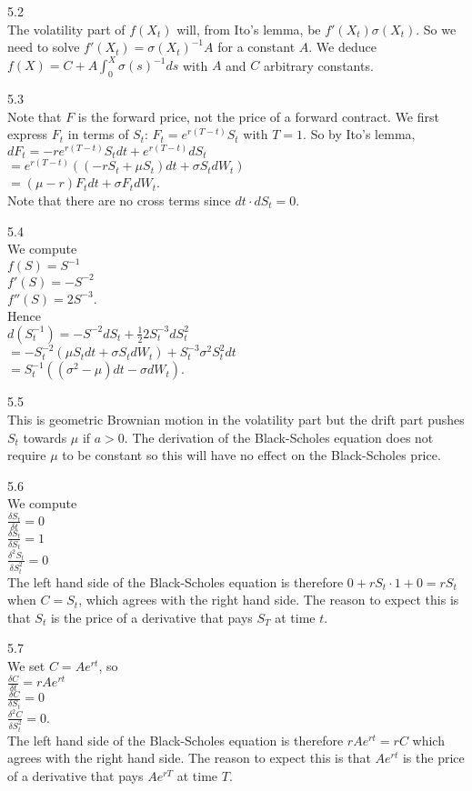 5.2 \\
The volatility part of $f(X_t)$ will, from Ito's lemma, be $f'(X_t) \sigma (X_t)$. So we need to solve $f'(X_t)=\sigma (X_t)^{-1} A$ for a constant $A$. We deduce $f(X)=C+A \int_0^X \sigma (s)^{-1} ds$ with $A$ and $C$ arbitrary constants.

5.3 \\
Note that $F$ is the forward price, not the price of a forward contract. We first express $F_t$ in terms of $S_t$: $F_t = e^{r(T-t)} S_t$ with $T=1$. So by Ito's lemma, \\
$dF_t=-re^{r(T-t)} S_t dt + e^{r(T-t)} dS_t$ \\
$=e^{r(T-t)} ((-rS_t + \mu S_t) dt + \sigma S_t dW_t)$ \\
$=(\mu - r) F_t dt + \sigma F_t dW_t$. \\
Note that there are no cross terms since $dt \cdot dS_t = 0$.

5.4 \\
We compute \\
$f(S)=S^{-1}$ \\
$f'(S)=-S^{-2}$ \\
$f''(S)=2S^{-3}$. \\
Hence \\
$d(S_t^{-1})=-S^{-2}dS_t + \frac{1}{2} 2 S_t^{-3} dS_t^2$ \\
$=-S_t^{-2} (\mu S_t dt + \sigma S_t dW_t) + S_t^{-3} \sigma^2 S_t^2 dt$ \\
$=S_t^{-1} ((\sigma^2 - \mu) dt - \sigma dW_t)$.

5.5 \\
This is geometric Brownian motion in the volatility part but the drift part pushes $S_t$ towards $\mu$ if $a>0$. The derivation of the Black-Scholes equation does not require $\mu$ to be constant so this will have no effect on the Black-Scholes price.

5.6 \\
We compute \\
$\frac{\delta S_t}{\delta t}=0$ \\
$\frac{\delta S_t}{\delta S_t}=1$ \\
$\frac{\delta^2 S_t}{\delta S_t^2}=0$ \\
The left hand side of the Black-Scholes equation is therefore $0 + r S_t \cdot 1 + 0 = r S_t$ when $C=S_t$, which agrees with the right hand side. The reason to expect this is that $S_t$ is the price of a derivative that pays $S_T$ at time $t$.

5.7 \\
We set $C=Ae^{rt}$, so \\
$\frac{\delta C}{\delta t}=rAe^{rt}$ \\
$\frac{\delta C}{\delta S_t}=0$ \\
$\frac{\delta^2 C}{\delta S_t^2}=0$. \\
The left hand side of the Black-Scholes equation is therefore $r A e^{rt}=rC$ which agrees with the right hand side. The reason to expect this is that $Ae^{rt}$ is the price of a derivative that pays $Ae^{rT}$ at time $T$.

